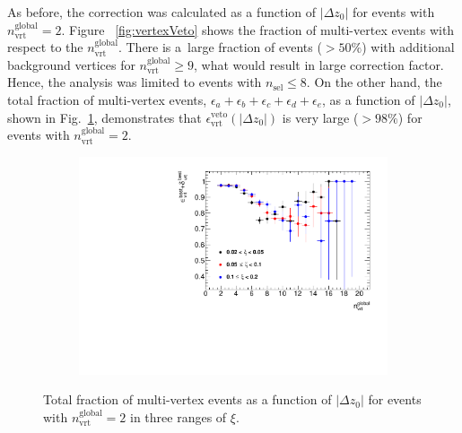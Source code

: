 As before, the correction was calculated as a function of $|\Delta z_0|$ for events with $n^\textrm{global}_\textrm{vrt}=2$. Figure~ \ref{fig:vertexVeto} shows the fraction of multi-vertex events  with respect to the $n_\textrm{vrt}^\textrm{global}$. There is a~large fraction of events ($>50\%$) with additional background vertices for $n_\textrm{vrt}^\textrm{global}\geq 9$, what would result in large correction factor. Hence, the analysis was limited to events with $n_\textrm{sel}\leq8$. On the other hand,  the total fraction of multi-vertex events, $\epsilon_a+\epsilon_b+\epsilon_c+\epsilon_d+\epsilon_e$, as a function of $|\Delta z_0|$, shown in Fig.~\ref{fig:vertexVetoDZ}, demonstrates that $\epsilon_\textrm{vrt}^\textrm{veto}(|\Delta z_0|)$ is very large ($>98\%$) for events with $n^\textrm{global}_\textrm{vrt}=2$.
\begin{figure}[h!]
	\centering
	\begin{subfigure}{.47\textwidth}
		\includegraphics[width=\textwidth,page=9]{chapters/chrgSTAR/img/vertex/vertexEffi_ksi.pdf}
	\end{subfigure}
	\begin{minipage}{.47\textwidth}
		\caption{Total fraction of multi-vertex events as a function of $|\Delta z_0|$ for events with $n^\textrm{global}_\textrm{vrt}=2$  in three ranges of $\xi$.}
		\label{fig:vertexVetoDZ}
	\end{minipage}
	\vspace{-0.5cm}
\end{figure}
